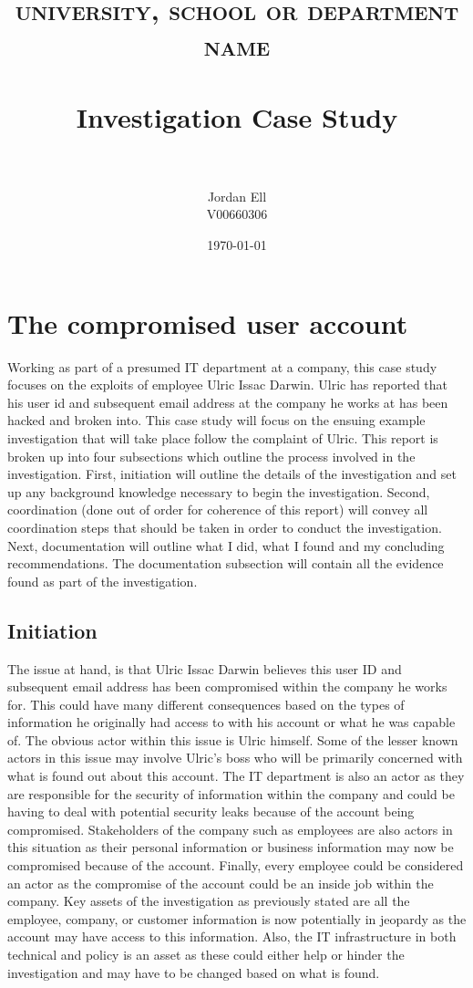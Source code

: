 \documentclass[paper=a4, fontsize=11pt]{scrartcl} %
\title{	
\normalfont \normalsize 
\textsc{university, school or department name} \\ [25pt] %
\horrule{0.5pt} \\[0.4cm] %
\huge Investigation Case Study \\ %
\horrule{2pt} \\[0.5cm] %
}
\author{Jordan Ell \\ V00660306} %
\date{\normalsize\today} %
\numberwithin{equation}{section} %
\numberwithin{figure}{section} %
\numberwithin{table}{section} %
\begin{document}
\maketitle %


\section{The compromised user account}
Working as part of a presumed IT department at a company, this case study focuses on the 
exploits of employee Ulric Issac Darwin. Ulric has reported that his user id and subsequent
email address at the company he works at has been hacked and broken into. This case study
will focus on the ensuing example investigation that will take place follow the complaint
of Ulric. This report is broken up into four subsections which outline the process involved
in the investigation. First, initiation will outline the details of the investigation and
set up any background knowledge necessary to begin the investigation. Second, coordination
(done out of order for coherence of this report) will convey all coordination steps that should
be taken in order to conduct the investigation. Next, documentation will outline what I did,
what I found and my concluding recommendations. The documentation subsection will contain
all the evidence found as part of the investigation.


\subsection{Initiation}
The issue at hand, is that Ulric Issac Darwin believes this user ID and subsequent email address
has been compromised within the company he works for. This could have many different consequences
based on the types of information he originally had access to with his account or what he
was capable of. The obvious actor within this issue is Ulric himself. Some of the lesser known
actors in this issue may involve Ulric's boss who will be primarily concerned with what is found
out about this account. The IT department is also an actor as they are responsible for the
security of information within the company and could be having to deal with potential security
leaks because of the account being compromised. Stakeholders of the company such as employees
are also actors in this situation as their personal information or business information may
now be compromised because of the account. Finally, every employee could be considered an actor
as the compromise of the account could be an inside job within the company. Key assets of the
investigation as previously stated are all the employee, company, or customer information is 
now potentially in jeopardy as the account may have access to this information. Also, the IT
infrastructure in both technical and policy is an asset as these could either help or hinder
the investigation and may have to be changed based on what is found.
\end{document}
